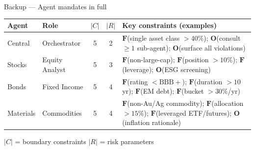 \documentclass[aspectratio=169,10pt]{beamer}
\begin{document}
\appendix

\begin{frame}{Backup --- Agent mandates in full}
  \centering\footnotesize
  \begin{tabularx}{0.97\textwidth}{@{}p{1.7cm} p{2.3cm} cc X@{}}
    \toprule
    \textbf{Agent} & \textbf{Role} & $|C|$ & $|R|$ & \textbf{Key constraints (examples)}\\
    \midrule
    Central & Orchestrator & 5 & 2 &
      $\mathbf{F}$(single asset class $>40\%$); $\mathbf{O}$(consult $\geq1$ sub-agent);
      $\mathbf{O}$(surface all violations)\\
    \midrule
    Stocks & Equity Analyst & 5 & 3 &
      $\mathbf{F}$(non-large-cap); $\mathbf{F}$(position $>10\%$);
      $\mathbf{F}$(leverage); $\mathbf{O}$(ESG screening)\\
    \midrule
    Bonds & Fixed Income & 5 & 4 &
      $\mathbf{F}$(rating $<\mathrm{BBB{+}}$); $\mathbf{F}$(duration $>10$\,yr);
      $\mathbf{F}$(EM debt); $\mathbf{F}$(bucket $>30\%$/yr)\\
    \midrule
    Materials & Commodities & 5 & 4 &
      $\mathbf{F}$(non-Au/Ag commodity); $\mathbf{F}$(allocation $>15\%$);
      $\mathbf{F}$(leveraged ETF/futures); $\mathbf{O}$(inflation rationale)\\
    \bottomrule
  \end{tabularx}
  \vspace{0.6em}

  {\footnotesize $|C|$ = boundary constraints \quad $|R|$ = risk parameters}
\end{frame}
\end{document}
